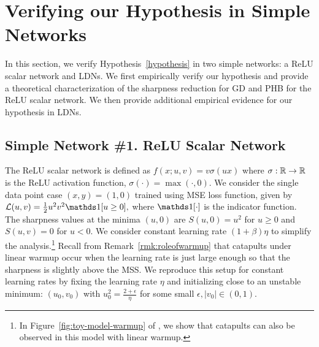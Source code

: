 \section{Verifying our Hypothesis in Simple Networks}
\label{sec:toy}
In this section, we verify Hypothesis~\ref{hypothesis} in two simple networks: a ReLU scalar network and LDNs.
We first empirically verify our hypothesis and provide a theoretical characterization of the sharpness reduction for GD and PHB for the ReLU scalar network.
We then provide additional empirical evidence for our hypothesis in LDNs.

\subsection{Simple Network \#1. ReLU Scalar Network}
The ReLU scalar network is defined as $f(x; u, v) = v \sigma(ux)$ where $\sigma: {\mathbb{R}} \to {\mathbb{R}}$ is the ReLU activation function, $\sigma(\cdot) = \max(\cdot, 0)$.
We consider the single data point case $(x,y)=(1,0)$ trained using MSE loss function, given by $\gL(u, v) = \tfrac{1}{2} u^2 v^2 \indicator[u \geq 0],$ where $\indicator[\cdot]$ is the indicator function.
The sharpness values at the minima $(u, 0)$ are $S(u, 0) = u^2$ for $u \geq 0$ and $S(u, v) = 0$ for $u < 0$.
We consider constant learning rate $(1 + \beta) \eta$ to simplify the analysis.\footnote{In Figure~\ref{fig:toy-model-warmup} of , we show that catapults can also be observed in this model with linear warmup.}
Recall from Remark~\ref{rmk:roleofwarmup} that catapults under linear warmup occur when the learning rate is just large enough so that the sharpness is slightly above the MSS. We reproduce this setup for constant learning rates by fixing the learning rate $\eta$ and initializing close to an unstable minimum: $(u_0,v_0)$ with $u_0^2 = \frac{2 + \epsilon}{\eta}$ for some small $\epsilon, |v_0| \in (0, 1)$.

